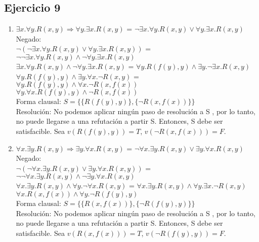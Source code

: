 \documentclass[10pt,a4paper]{article}
\begin{document}
\subsection{Ejercicio 9}
    \begin{enumerate}
    \item
    $\exists x. \forall y. R(x,y) \Rightarrow \forall y. \exists x. R(x,y)$  =  $\lnot \exists x. \forall y. R(x,y) \lor \forall y. \exists x. R(x,y)$ \\
    Negado: \\
    $\lnot (\lnot \exists x. \forall y. R(x,y) \lor \forall y. \exists x. R(x,y))$  =  $ \lnot \lnot \exists x. \forall y. R(x,y) \land \lnot \forall y. \exists x. R(x,y) $ \\
    $ \exists x. \forall y. R(x,y) \land \lnot \forall y. \exists x. R(x,y) $  =  $ \forall y. R(f(y),y) \land \exists y. \lnot \exists x. R(x,y) $ \\
    $ \forall y. R(f(y),y) \land \exists y. \forall x. \lnot R(x,y) $  =  $ \forall y. R(f(y),y) \land \forall x. \lnot R(x,f(x)) $ \\
    $ \forall y. \forall x.  R(f(y),y) \land \lnot R(x,f(x)) $ \\
    Forma clausal: $S=\{\{ R(f(y),y)\},\{ \lnot R(x,f(x))\} \}$ \\
    Resolución: No podemos aplicar ningún paso de resolución a S , por lo tanto, no puede llegarse a una refutación a partir S. Entonces, S debe ser satisfacible. Sea $v(R(f(y),y))=T$, $v(\lnot R(x,f(x)))=F$.
    \item
    $\forall x. \exists y. R(x,y) \Rightarrow \exists y. \forall x. R(x,y)$  =  $\lnot \forall x. \exists y. R(x,y) \lor \exists y. \forall x. R(x,y)$ \\
    Negado: \\
    $\lnot (\lnot \forall x. \exists y. R(x,y) \lor \exists y. \forall x. R(x,y))$  =  $\lnot \lnot \forall x. \exists y. R(x,y) \land \lnot \exists y. \forall x. R(x,y)$ \\
    $\forall x. \exists y. R(x,y) \land \forall y. \lnot \forall x. R(x,y)$  =  $\forall x. \exists y. R(x,y) \land \forall y. \exists x. \lnot R(x,y)$ \\
    $\forall x. R(x,f(x)) \land \forall y. \lnot R(f(y),y)$ \\
    Forma clausal: $S=\{ \{ R(x,f(x))\},\{ \lnot R(f(y),y) \}\}$ \\
    Resolución: No podemos aplicar ningún paso de resolución a S  , por lo tanto, no puede llegarse a una refutación a partir S. Entonces, S debe ser satisfacible. Sea $v(R(x,f(x)))=T$, $v(\lnot R(f(y),y))=F$.

\end{enumerate}
\end{document}
